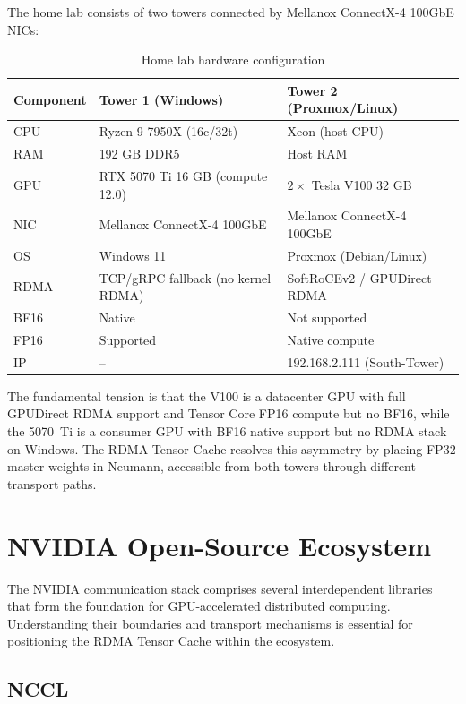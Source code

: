 \documentclass[11pt,letterpaper]{article}
\theoremstyle{definition}
\begin{document}
The home lab consists of two towers connected by Mellanox ConnectX-4 100GbE NICs:

\begin{table}[htbp]
\centering
\caption{Home lab hardware configuration}
\label{tab:hardware}
\begin{tabular}{@{}lll@{}}
\toprule
\textbf{Component} & \textbf{Tower 1 (Windows)} & \textbf{Tower 2 (Proxmox/Linux)} \\
\midrule
CPU & Ryzen 9 7950X (16c/32t) & Xeon (host CPU) \\
RAM & 192 GB DDR5 & Host RAM \\
GPU & RTX 5070 Ti 16 GB (compute 12.0) & $2\times$ Tesla V100 32 GB \\
NIC & Mellanox ConnectX-4 100GbE & Mellanox ConnectX-4 100GbE \\
OS & Windows 11 & Proxmox (Debian/Linux) \\
RDMA & TCP/gRPC fallback (no kernel RDMA) & SoftRoCEv2 / GPUDirect RDMA \\
BF16 & Native & Not supported \\
FP16 & Supported & Native compute \\
IP & -- & 192.168.2.111 (South-Tower) \\
\bottomrule
\end{tabular}
\end{table}

The fundamental tension is that the V100 is a datacenter GPU with full GPUDirect RDMA support and Tensor Core FP16 compute but no BF16, while the 5070~Ti is a consumer GPU with BF16 native support but no RDMA stack on Windows. The RDMA Tensor Cache resolves this asymmetry by placing FP32 master weights in Neumann, accessible from both towers through different transport paths.

\section{NVIDIA Open-Source Ecosystem}
\label{sec:nvidia-ecosystem}

The NVIDIA communication stack comprises several interdependent libraries that form the foundation for GPU-accelerated distributed computing. Understanding their boundaries and transport mechanisms is essential for positioning the RDMA Tensor Cache within the ecosystem.

\subsection{NCCL}
\end{document}
